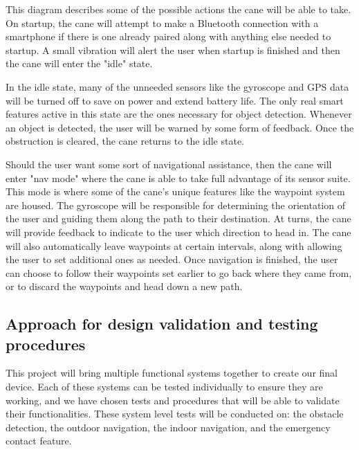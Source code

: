 \documentclass[letterpaper,12pt]{article}
\begin{document}

\medskip

This diagram describes some of the possible actions the cane will be able to take. On startup, the cane will attempt to make a Bluetooth connection with a smartphone if there is one already paired along with anything else needed to startup. A small vibration will alert the user when startup is finished and then the cane will enter the "idle" state. \par

In the idle state, many of the unneeded sensors like the gyroscope and GPS data will be turned off to save on power and extend battery life. The only real smart features active in this state are the ones necessary for object detection. Whenever an object is detected, the user will be warned by some form of feedback. Once the obstruction is cleared, the cane returns to the idle state. \par 

Should the user want some sort of navigational assistance, then the cane will enter "nav mode" where the cane is able to take full advantage of its sensor suite. This mode is where some of the cane's unique features like the waypoint system are housed. The gyroscope will be responsible for determining the orientation of the user and guiding them along the path to their destination. At turns, the cane will provide feedback to indicate to the user which direction to head in. The cane will also automatically leave waypoints at certain intervals, along with allowing the user to set additional ones as needed. Once navigation is finished, the user can choose to follow their waypoints set earlier to go back where they came from, or to discard the waypoints and head down a new path. \par

\subsection{Approach for design validation and testing procedures}
This project will bring multiple functional systems together to create our final device. Each of these systems can be tested individually to ensure they are working, and we have chosen tests and procedures that will be able to validate their functionalities. These system level tests will be conducted on: the obstacle detection, the outdoor navigation, the indoor navigation, and the emergency contact feature. \par
\end{document}
